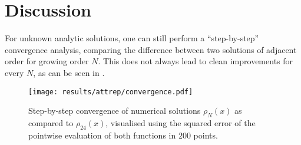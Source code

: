 

\pagebreak


\section{Discussion}
For unknown analytic solutions, one can still perform a ``step-by-step'' convergence analysis, comparing the difference between two solutions of adjacent order for growing order $N$.
This does not always lead to clean improvements for every $N$, as can be seen in .

\begin{figure}[H]
  \centering
  \texttt{[image: results/attrep/convergence.pdf]}
  \caption[Step-by-step convergence of solutions compared to order 24]{Step-by-step convergence of numerical solutions $\rho_N(x)$ as compared to $\rho_{24}(x)$, visualised using the squared error of the pointwise evaluation of both functions in $200$ points.}
  \label{fig:convergence}
\end{figure}
